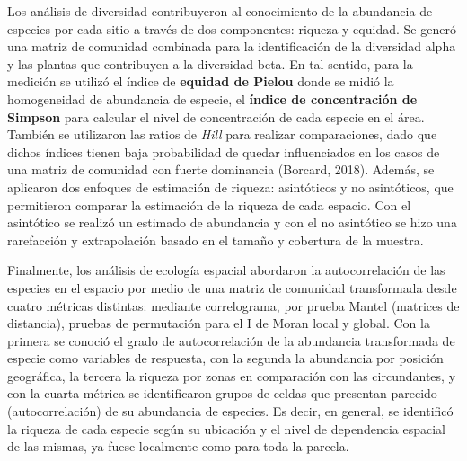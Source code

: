 \documentclass[11pt,]{article}
\begin{document}
Los análisis de diversidad contribuyeron al conocimiento de la
abundancia de especies por cada sitio a través de dos componentes:
riqueza y equidad. Se generó una matriz de comunidad combinada para la
identificación de la diversidad alpha y las plantas que contribuyen a la
diversidad beta. En tal sentido, para la medición se utilizó el índice
de \textbf{equidad de Pielou} donde se midió la homogeneidad de
abundancia de especie, el \textbf{índice de concentración de Simpson}
para calcular el nivel de concentración de cada especie en el área.
También se utilizaron las ratios de \emph{Hill} para realizar
comparaciones, dado que dichos índices tienen baja probabilidad de
quedar influenciados en los casos de una matriz de comunidad con fuerte
dominancia (Borcard, 2018). Además, se aplicaron dos enfoques de
estimación de riqueza: asintóticos y no asintóticos, que permitieron
comparar la estimación de la riqueza de cada espacio. Con el asintótico
se realizó un estimado de abundancia y con el no asintótico se hizo una
rarefacción y extrapolación basado en el tamaño y cobertura de la
muestra.

Finalmente, los análisis de ecología espacial abordaron la
autocorrelación de las especies en el espacio por medio de una matriz de
comunidad transformada desde cuatro métricas distintas: mediante
correlograma, por prueba Mantel (matrices de distancia), pruebas de
permutación para el I de Moran local y global. Con la primera se conoció
el grado de autocorrelación de la abundancia transformada de especie
como variables de respuesta, con la segunda la abundancia por posición
geográfica, la tercera la riqueza por zonas en comparación con las
circundantes, y con la cuarta métrica se identificaron grupos de celdas
que presentan parecido (autocorrelación) de su abundancia de especies.
Es decir, en general, se identificó la riqueza de cada especie según su
ubicación y el nivel de dependencia espacial de las mismas, ya fuese
localmente como para toda la parcela.
\end{document}
